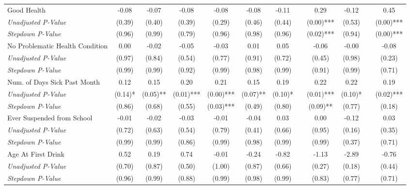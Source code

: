 \begin{tabular}{l c c c c c c c c c c c}
Good Health & -0.08 & -0.07 & -0.08 & -0.08 & -0.08 & -0.11 & & 0.29 & -0.12 & & 0.45 \\
\quad \textit{Unadjusted P-Value} & (0.39) & (0.40) & (0.39) & (0.29) & (0.46) & (0.44) & & (0.00)*** & (0.53) & & (0.00)*** \\
\quad \textit{Stepdown P-Value} & (0.96) & (0.99) & (0.79) & (0.96) & (0.98) & (0.96) & & (0.02)*** & (0.94) & & (0.00)*** \\
No Problematic Health Condition & 0.00 & -0.02 & -0.05 & -0.03 & 0.01 & 0.05 & & -0.06 & -0.00 & & -0.08 \\
\quad \textit{Unadjusted P-Value} & (0.97) & (0.84) & (0.54) & (0.77) & (0.91) & (0.72) & & (0.45) & (0.98) & & (0.23) \\
\quad \textit{Stepdown P-Value} & (0.99) & (0.99) & (0.92) & (0.99) & (0.98) & (0.99) & & (0.91) & (0.99) & & (0.71) \\
Num. of Days Sick Past Month & 0.12 & 0.15 & 0.20 & 0.21 & 0.15 & 0.19 & & 0.22 & 0.22 & & 0.19 \\
\quad \textit{Unadjusted P-Value} & (0.14)* & (0.05)** & (0.01)*** & (0.00)*** & (0.07)** & (0.10)* & & (0.01)*** & (0.10)* & & (0.02)*** \\
\quad \textit{Stepdown P-Value} & (0.86) & (0.68) & (0.55) & (0.03)*** & (0.49) & (0.80) & & (0.09)** & (0.77) & & (0.18) \\
Ever Suspended from School & -0.01 & -0.02 & -0.03 & -0.01 & -0.04 & 0.03 & & 0.00 & -0.12 & & 0.03 \\
\quad \textit{Unadjusted P-Value} & (0.72) & (0.63) & (0.54) & (0.79) & (0.41) & (0.66) & & (0.95) & (0.16) & & (0.35) \\
\quad \textit{Stepdown P-Value} & (0.99) & (0.99) & (0.86) & (0.99) & (0.98) & (0.99) & & (0.99) & (0.37) & & (0.71) \\
Age At First Drink & 0.52 & 0.19 & 0.74 & -0.01 & -0.24 & -0.82 & & -1.13 & -2.89 & & -0.76 \\
\quad \textit{Unadjusted P-Value} & (0.70) & (0.87) & (0.50) & (1.00) & (0.87) & (0.66) & & (0.27) & (0.18) & & (0.44) \\
\quad \textit{Stepdown P-Value} & (0.96) & (0.99) & (0.88) & (0.99) & (0.98) & (0.99) & & (0.83) & (0.77) & & (0.71) \\
\bottomrule
\end{tabular}
